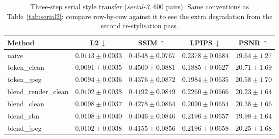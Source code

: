 \documentclass[runningheads]{llncs}
\begin{document}
\begin{table}[t]
\centering
\caption{Three-step serial style transfer (\emph{serial-3}, $600$ pairs). Same conventions as Table~\ref{tab:serial2}; compare row-by-row against it to see the extra degradation from the second re-stylisation pass.}
\label{tab:serial3}
\setlength{\tabcolsep}{4pt}
\footnotesize
\begin{tabular}{lcccc}
\toprule
\textbf{Method} & \textbf{L2}\,$\downarrow$ & \textbf{SSIM}\,$\uparrow$ & \textbf{LPIPS}\,$\downarrow$ & \textbf{PSNR}\,$\uparrow$ \\
\midrule
naive                & $0.0113\pm0.0033$ & $0.4548\pm0.0767$ & $0.2378\pm0.0684$ & $19.64\pm1.27$ \\
\rowcolor{rowshade}
token\_clean          & $\mathbf{0.0091\pm0.0035}$ & $0.4500\pm0.0881$ & $\mathbf{0.1885\pm0.0627}$ & $\mathbf{20.71\pm1.69}$ \\
token\_jpeg           & $0.0094\pm0.0036$ & $0.4376\pm0.0872$ & $0.1984\pm0.0635$ & $20.58\pm1.70$ \\
\rowcolor{rowshade}
blend\_render\_clean  & $0.0102\pm0.0038$ & $0.4192\pm0.0849$ & $0.2260\pm0.0666$ & $20.23\pm1.64$ \\
blend\_clean          & $0.0098\pm0.0037$ & $0.4278\pm0.0864$ & $0.2090\pm0.0654$ & $20.38\pm1.66$ \\
\rowcolor{rowshade}
blend\_rbn            & $0.0108\pm0.0040$ & $0.4046\pm0.0846$ & $0.2196\pm0.0657$ & $19.98\pm1.64$ \\
blend\_jpeg           & $0.0102\pm0.0038$ & $0.4155\pm0.0856$ & $0.2196\pm0.0658$ & $20.25\pm1.68$ \\
\bottomrule
\end{tabular}
\end{table}
\end{document}
